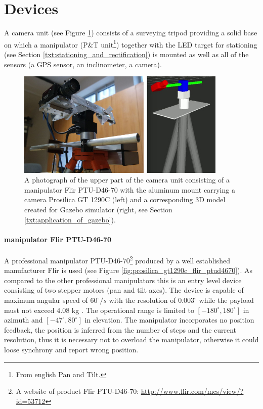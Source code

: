\section{Devices} \label{txt:devices}

A camera unit (see Figure \ref{fig:camera_unit_photo_model}) consists of a surveying tripod providing a solid base on which a manipulator (P\&T unit\footnote{From english Pan and Tilt.}) together with the LED target for stationing (see Section \ref{txt:stationing_and_rectification}) is mounted as well as all of the sensors (a GPS sensor, an inclinometer, a camera).

\begin{figure}[htb]
	\centering
	\includegraphics[width=10cm]{fig/camera_unit_photo_model.jpg}
	\caption{A photograph of the upper part of the camera unit consisting of a manipulator Flir PTU-D46-70 with the aluminum mount carrying a camera Prosilica GT 1290C (left) and a corresponding 3D model created for Gazebo simulator (right, see Section \ref{txt:application_of_gazebo}).}
	\label{fig:camera_unit_photo_model}
\end{figure}

\paragraph{manipulator Flir PTU-D46-70} A professional manipulator PTU-D46-70\footnote{A website of product Flir PTU-D46-70: \url{http://www.flir.com/mcs/view/?id=53712}} produced by a well established manufacturer Flir is used (see Figure \ref{fig:prosilica_gt1290c_flir_ptud4670}). As compared to the other professional manipulators this is an entry level device consisting of two stepper motors (pan and tilt axes). The device is capable of maximum angular speed of $60^{\circ}/s$ with the resolution of $0.003^{\circ}$ while the payload must not exceed 4.08 kg \cite{Flir_ptud4670}. The operational range is limited to $[-180^{\circ}, 180^{\circ}]$ in azimuth and $[-47^{\circ}, 80^{\circ}]$ in elevation. The manipulator incorporates no position feedback, the position is inferred from the number of steps and the current resolution, thus it is necessary not to overload the manipulator, otherwise it could loose synchrony and report wrong position. 

